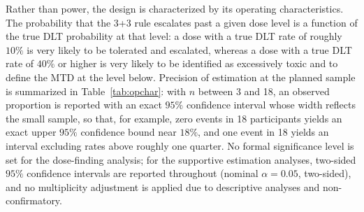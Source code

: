 Rather than power, the design is characterized by its operating characteristics.
The probability that the 3+3 rule escalates past a given dose level is a function
of the true DLT probability at that level: a dose with a true DLT rate of roughly
$10\%$ is very likely to be tolerated and escalated, whereas a dose with a true
DLT rate of $40\%$ or higher is very likely to be identified as excessively toxic
and to define the MTD at the level below. Precision of estimation at the planned
sample is summarized in Table~\ref{tab:opchar}: with $n$ between 3 and 18, an
observed proportion is reported with an exact $95\%$ confidence interval whose
width reflects the small sample, so that, for example, zero events in 18
participants yields an exact upper $95\%$ confidence bound near $18\%$, and one
event in 18 yields an interval excluding rates above roughly one quarter. No
formal significance level is set for the dose-finding analysis; for the supportive
estimation analyses, two-sided $95\%$ confidence intervals are reported throughout
(nominal $\alpha = 0.05$, two-sided), and no multiplicity adjustment is applied due to descriptive analyses and non-confirmatory.

